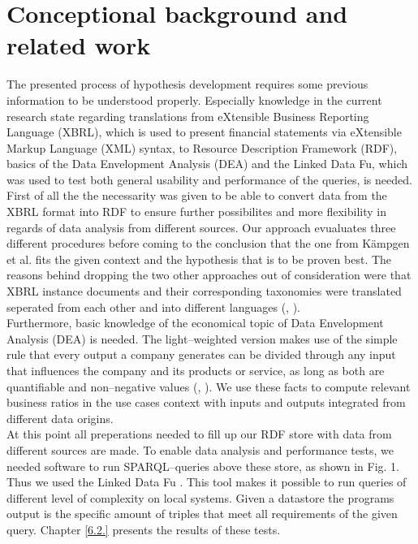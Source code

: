 \documentclass[runningheads]{llncs}
\begin{document}
\section{Conceptional background and related work}
\label{c2}
The presented process of hypothesis development requires some previous information to be understood properly. Especially knowledge in the current research state regarding translations from eXtensible Business Reporting Language (XBRL), which is used to present financial statements via eXtensible Markup Language (XML) syntax, to Resource Description Framework (RDF), basics of the Data Envelopment Analysis (DEA) and the Linked Data Fu, which was used to test both general usability and performance of the queries, is needed.\\
First of all the the necessarity was given to be able to convert data from the XBRL format into RDF to ensure further possibilites and more flexibility in regards of data analysis \cite{Mill98} from different sources. Our approach evualuates three different procedures before coming to the conclusion that the one from K\"ampgen et al. \cite{KWOW14} fits the given context and the hypothesis that is to be proven best. The reasons behind dropping the two other approaches out of consideration were that XBRL instance documents and their corresponding taxonomies were translated seperated from each other and into different languages (\cite{GaGi10}, \cite{BRLD10}).\\
Furthermore, basic knowledge of the economical topic of Data Envelopment Analysis (DEA) is needed. The light--weighted version makes use of the simple rule that every output a company generates can be divided through any input that influences the company and its products or service, as long as both are quantifiable and non--negative values (\cite{Schu14}, \cite{Wei01}). We use these facts to compute relevant business ratios in the use cases context \cite{CeCP08} with inputs and outputs integrated from different data origins.\\
At this point all preperations needed to fill up our RDF store with data from different sources are made. To enable data analysis and performance tests, we needed software to run SPARQL--queries above these store, as shown in Fig. 1. Thus we used the Linked Data Fu \cite{SSHS13}. This tool makes it possible to run queries of different level of complexity on local systems. Given a datastore the programs output is the specific amount of triples that meet all requirements of the given query. Chapter \ref{6.2.} presents the results of these tests.
\end{document}
